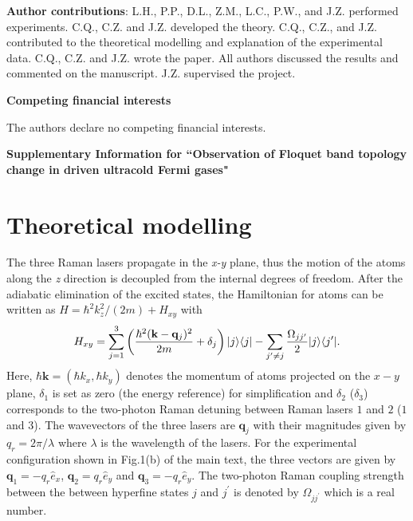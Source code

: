 \documentclass[aps,prl,twocolumn,floatfix,reprint]{revtex4}
\begin{document}
\textbf{Author contributions}: L.H., P.P., D.L., Z.M., L.C., P.W., and J.Z.
performed experiments. C.Q., C.Z. and J.Z. developed the theory. C.Q., C.Z.,
and J.Z. contributed to the theoretical modelling and explanation of the
experimental data. C.Q., C.Z. and J.Z. wrote the paper. All authors
discussed the results and commented on the manuscript. J.Z. supervised the
project.

\textbf{Competing financial interests}

The authors declare no competing financial interests.

\newpage

\begin{widetext}

\textbf{Supplementary Information for ``Observation of Floquet band topology
change in driven ultracold Fermi gases"}


\section{Theoretical modelling}

The three Raman lasers propagate in the \textit{x-y} plane, thus the motion
of the atoms along the \textit{z} direction is decoupled from the internal
degrees of freedom. After the adiabatic elimination of the excited states,
the Hamiltonian for atoms can be written as $H=\hbar
^{2}k_{z}^{2}/(2m)+H_{xy}$ with
\begin{equation}
H_{xy}=\sum_{j=1}^{3}\left( \frac{\hbar ^{2}(\mathbf{k}-\mathbf{q}_{j})^{2}}{%
2m}+\delta _{j}\right) |j\rangle \langle j|-\sum_{j^{\prime }\neq j}\frac{%
\Omega _{jj^{\prime }}}{2}|j\rangle \langle j^{\prime }|.  \label{eq:Hxy}
\end{equation}%
Here, $\hbar \mathbf{k}=(\hbar k_{x},\hbar k_{y})$ denotes the momentum of
atoms projected on the $x-y$ plane, $\delta _{1}$ is set as zero (the energy
reference) for simplification and $\delta _{2}$ ($\delta _{3}$) corresponds
to the two-photon Raman detuning between Raman lasers $1$ and $2$ ($1$ and $%
3 $). The wavevectors of the three lasers are $\mathbf{q}_{j}$ with their
magnitudes given by $q_{r}=2\pi /\lambda $ where $\lambda $ is the
wavelength of the lasers. For the experimental configuration shown in
Fig.1(b) of the main text, the three vectors are given by $\mathbf{q}%
_{1}=-q_{r}\hat{e}_{x}$, $\mathbf{q}_{2}=q_{r}\hat{e}_{y}$ and $\mathbf{q}%
_{3}=-q_{r}\hat{e}_{y}$. The two-photon Raman coupling strength between the
between hyperfine states $j$ and $j^\prime$ is denoted by $\Omega
_{jj^{\prime }}$ which is a real number.


\end{widetext}
\end{document}
